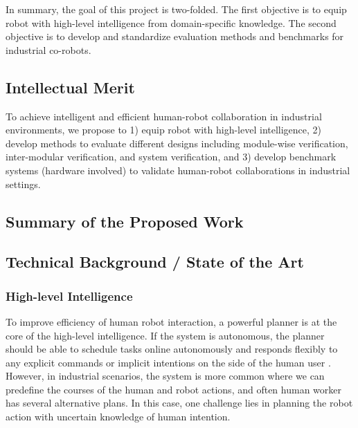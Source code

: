 In summary, the goal of this project is two-folded. The first objective is to equip robot with high-level intelligence from domain-specific knowledge. The second objective is to develop and standardize evaluation methods and benchmarks for industrial co-robots.

\subsection{Intellectual Merit}

To achieve intelligent and efficient human-robot collaboration in industrial environments, we propose to 1) equip robot with high-level intelligence, 2) develop methods to evaluate different designs including module-wise verification, inter-modular verification, and system verification, and 3) develop benchmark systems (hardware involved) to validate human-robot collaborations in industrial settings.


\subsection{Summary of the Proposed Work}



\subsection{Technical Background / State of the Art}

\subsubsection{High-level Intelligence}

To improve efficiency of human robot interaction, a powerful planner is at the core of the high-level intelligence. If the system is autonomous, the planner should be able to schedule tasks online autonomously and responds flexibly to any explicit commands or implicit intentions on the side of the human user \cite{schrempf2005nove}. However, in industrial scenarios, the system is more common where we can predefine the courses of the human and robot actions, and often human worker has several alternative plans. In this case, one challenge lies in planning the robot action with uncertain knowledge of human intention. 

